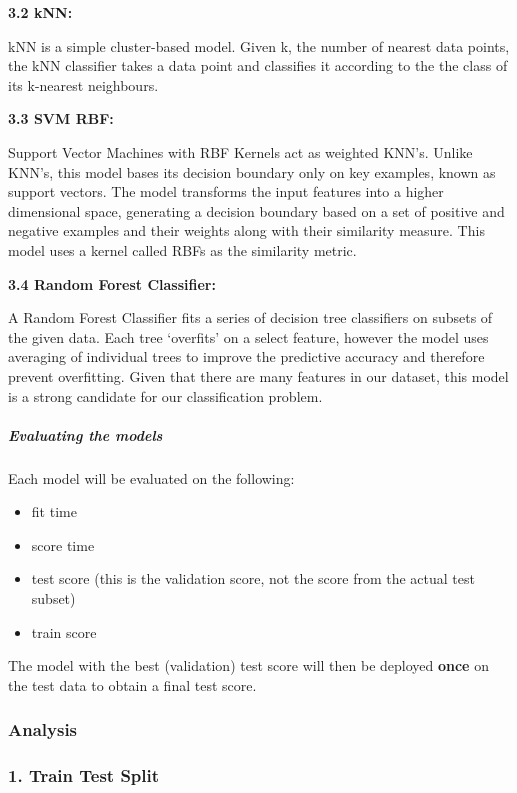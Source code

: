 \documentclass[
  letterpaper,
  DIV=11,
  numbers=noendperiod]{scrartcl}
\let\oldsubparagraph\subparagraph
\renewcommand{\subparagraph}[1]{\oldsubparagraph{#1}\mbox{}}
\begin{document}
\textbf{3.2 kNN:}

kNN is a simple cluster-based model. Given k, the number of nearest data
points, the kNN classifier takes a data point and classifies it
according to the the class of its k-nearest neighbours.

\textbf{3.3 SVM RBF:}

Support Vector Machines with RBF Kernels act as weighted KNN's. Unlike
KNN's, this model bases its decision boundary only on key examples,
known as support vectors. The model transforms the input features into a
higher dimensional space, generating a decision boundary based on a set
of positive and negative examples and their weights along with their
similarity measure. This model uses a kernel called RBFs as the
similarity metric.

\textbf{3.4 Random Forest Classifier:}

A Random Forest Classifier fits a series of decision tree classifiers on
subsets of the given data. Each tree `overfits' on a select feature,
however the model uses averaging of individual trees to improve the
predictive accuracy and therefore prevent overfitting. Given that there
are many features in our dataset, this model is a strong candidate for
our classification problem.

\subparagraph{Evaluating the models}\label{evaluating-the-models}

Each model will be evaluated on the following:

\begin{itemize}
\item
  fit time
\item
  score time
\item
  test score (this is the validation score, not the score from the
  actual test subset)
\item
  train score
\end{itemize}

The model with the best (validation) test score will then be deployed
\textbf{once} on the test data to obtain a final test score.

\subsubsection{Analysis}\label{analysis}

\subsubsection{1. Train Test Split}\label{train-test-split-1}
\end{document}
